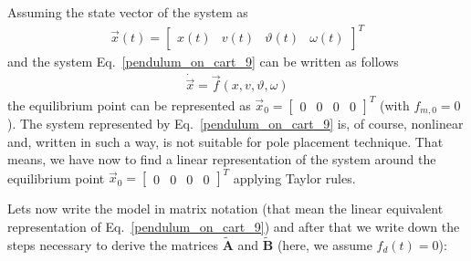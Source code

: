 \documentclass[12pt,a4paper,oneside]{book}
\begin{document}
\begin{onehalfspace}
Assuming the state vector of the system as
\begin{equation}\label{pendulum_on_cart_10}
	\begin{aligned}
		\vec{x}(t)=\begin{bmatrix} x(t)&v(t)&\vartheta(t)&\omega(t)\end{bmatrix}^T
	\end{aligned}
\end{equation}
and the system Eq.~\eqref{pendulum_on_cart_9} can be written as follows
\begin{equation}\label{pendulum_on_cart_10b}
	\begin{aligned}
		\dot{\vec{x}}=\vec{f}(x,v,\vartheta,\omega)
	\end{aligned}
\end{equation}
the equilibrium point can be represented as $\vec{x}_0=\begin{bmatrix} 0&0&0&0\end{bmatrix}^T$ (with $f_{m,0}=0$). 
The system represented by Eq.~\eqref{pendulum_on_cart_9} is, of course, nonlinear and, written in such a way, is not suitable for pole placement technique. That means, we have now to find a linear representation of the system around the equilibrium point $\vec{x}_0=\begin{bmatrix} 0&0&0&0\end{bmatrix}^T$ applying Taylor rules.

Lets now write the model in matrix notation (that mean the linear equivalent representation  of Eq.~\eqref{pendulum_on_cart_9}) and after that we write down the steps necessary to derive the matrices $\tilde{\mathbf{A}}$ and $\tilde{\mathbf{B}}$ (here, we assume $f_{d}(t)=0$):



\end{onehalfspace}
\end{document}
